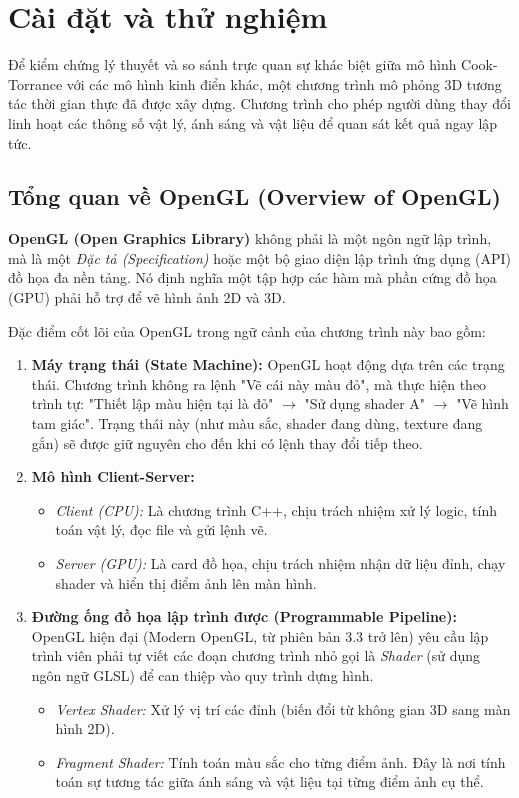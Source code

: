 \chapter{Cài đặt và thử nghiệm}

Để kiểm chứng lý thuyết và so sánh trực quan sự khác biệt giữa mô hình Cook-Torrance với các mô hình kinh điển khác, một chương trình mô phỏng 3D tương tác thời gian thực đã được xây dựng. Chương trình cho phép người dùng thay đổi linh hoạt các thông số vật lý, ánh sáng và vật liệu để quan sát kết quả ngay lập tức.

\section{Tổng quan về OpenGL (Overview of OpenGL)}

\textbf{OpenGL (Open Graphics Library)} không phải là một ngôn ngữ lập trình, mà là một \textit{Đặc tả (Specification)} hoặc một bộ giao diện lập trình ứng dụng (API) đồ họa đa nền tảng. Nó định nghĩa một tập hợp các hàm mà phần cứng đồ họa (GPU) phải hỗ trợ để vẽ hình ảnh 2D và 3D.

Đặc điểm cốt lõi của OpenGL trong ngữ cảnh của chương trình này bao gồm:

\begin{enumerate}
	\item \textbf{Máy trạng thái (State Machine):}
	OpenGL hoạt động dựa trên các trạng thái. Chương trình không ra lệnh "Vẽ cái này màu đỏ", mà thực hiện theo trình tự: "Thiết lập màu hiện tại là đỏ" $\rightarrow$ "Sử dụng shader A" $\rightarrow$ "Vẽ hình tam giác". Trạng thái này (như màu sắc, shader đang dùng, texture đang gắn) sẽ được giữ nguyên cho đến khi có lệnh thay đổi tiếp theo.
	
	\item \textbf{Mô hình Client-Server:}
	\begin{itemize}
		\item \textit{Client (CPU):} Là chương trình C++, chịu trách nhiệm xử lý logic, tính toán vật lý, đọc file và gửi lệnh vẽ.
		
		\item \textit{Server (GPU):} Là card đồ họa, chịu trách nhiệm nhận dữ liệu đỉnh, chạy shader và hiển thị điểm ảnh lên màn hình.
	\end{itemize}
	
	\item \textbf{Đường ống đồ họa lập trình được (Programmable Pipeline):}
	OpenGL hiện đại (Modern OpenGL, từ phiên bản 3.3 trở lên) yêu cầu lập trình viên phải tự viết các đoạn chương trình nhỏ gọi là \textit{Shader} (sử dụng ngôn ngữ GLSL) để can thiệp vào quy trình dựng hình.
	\begin{itemize}
		\item \textit{Vertex Shader:} Xử lý vị trí các đỉnh (biến đổi từ không gian 3D sang màn hình 2D).
		\item \textit{Fragment Shader:} Tính toán màu sắc cho từng điểm ảnh. Đây là nơi tính toán sự tương tác giữa ánh sáng và vật liệu tại từng điểm ảnh cụ thể.
	\end{itemize}
\end{enumerate}

